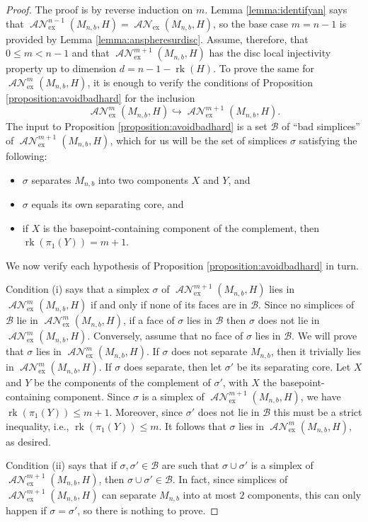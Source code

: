 \documentclass[11pt]{amsart}
\numberwithin{equation}{section}
\theoremstyle{plain}
\theoremstyle{definition}
\theoremstyle{remark}
\DeclareMathOperator{\rank}{rk}
\newcommand\cB{\ensuremath{\mathcal{B}}}
\DeclareMathOperator{\ANSpheres}{\mathcal{AN}}
\newcommand\ANSpheresEX{\ANSpheres_{\text{ex}}}
\begin{document}
\begin{proof}
The proof is by reverse induction on $m$.  Lemma \ref{lemma:identifyan} says that
$\ANSpheresEX^{n-1}(M_{n,b},H) = \ANSpheresEX(M_{n,b},H)$, so
the base case $m=n-1$ is provided by Lemma \ref{lemma:anspheresurdisc}.  Assume, therefore, that
$0 \leq m < n-1$ and that $\ANSpheresEX^{m+1}(M_{n,b},H)$ has
the disc local injectivity property up to dimension $d=n-1-\rank(H)$.
To prove the same for
$\ANSpheresEX^m(M_{n,b},H)$, it is enough to verify the conditions of
Proposition \ref{proposition:avoidbadhard} for the inclusion
\[\ANSpheresEX^m(M_{n,b},H) \hookrightarrow \ANSpheresEX^{m+1}(M_{n,b},H).\]
The input to Proposition \ref{proposition:avoidbadhard} is a set $\cB$ of ``bad simplices''
of $\ANSpheresEX^{m+1}(M_{n,b},H)$, which
for us will be the set of simplices $\sigma$ satisfying the following:
\begin{itemize}
\item $\sigma$ separates $M_{n,b}$ into two components $X$ and $Y$, and
\item $\sigma$ equals its own separating core, and
\item if $X$ is the basepoint-containing component of the complement, then $\rank(\pi_1(Y)) = m+1$.
\end{itemize}
We now verify each hypothesis of Proposition \ref{proposition:avoidbadhard} in turn.

Condition (i) says that a simplex $\sigma$ of $\ANSpheresEX^{m+1}(M_{n,b},H)$ lies in $\ANSpheresEX^{m}(M_{n,b},H)$ if
and only if none of its faces are in $\cB$.  Since no simplices of $\cB$ lie in $\ANSpheresEX^{m}(M_{n,b},H)$, if
a face of $\sigma$ lies in $\cB$ then 
$\sigma$ does not lie in $\ANSpheresEX^{m}(M_{n,b},H)$.  Conversely, assume that no face of $\sigma$ lies in $\cB$.
We will prove that $\sigma$ lies in $\ANSpheresEX^{m}(M_{n,b},H)$.
If $\sigma$ does not separate $M_{n,b}$, then it trivially
lies in $\ANSpheresEX^{m}(M_{n,b},H)$.  If $\sigma$ does separate, then let $\sigma'$
be its separating core.  Let $X$ and $Y$ be the components
of the complement of $\sigma'$, with $X$ the basepoint-containing component.  Since $\sigma$ is a
simplex of $\ANSpheresEX^{m+1}(M_{n,b},H)$, we have $\rank(\pi_1(Y)) \leq m+1$.  Moreover,
since $\sigma'$ does not lie in $\cB$ this must be a strict inequality, i.e., $\rank(\pi_1(Y)) \leq m$.
It follows that $\sigma$ lies in $\ANSpheresEX^{m}(M_{n,b},H)$, as desired.

Condition (ii) says that if $\sigma,\sigma' \in \cB$ are such that $\sigma \cup \sigma'$ is a simplex
of $\ANSpheresEX^{m+1}(M_{n,b},H)$, then $\sigma \cup \sigma' \in \cB$.  In fact, since
simplices of $\ANSpheresEX^{m+1}(M_{n,b},H)$ can separate $M_{n,b}$ into at most $2$ components, this
can only happen if $\sigma = \sigma'$, so there is nothing to prove.


\end{proof}
\end{document}
